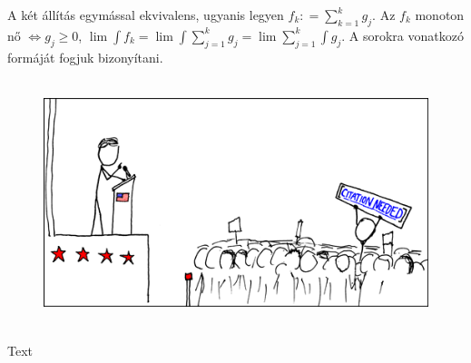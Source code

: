 \documentclass[12pt,a4paper]{scrartcl}
\newenvironment{ajanlofig}{\begin{figure}\begin{center}}{
\end{center}\end{figure}}
\begin{document}
A két állítás egymással ekvivalens, ugyanis legyen
\(f_{k}: = {\sum\limits_{k = 1}^{k}g_{j}}\). Az \(f_{k}\) monoton nő
\(\left. \Leftrightarrow g_{j} \geq 0 \right.\),
\(\lim{\int f_{k}} = \lim{\int{\sum\limits_{j = 1}^{k}g_{j}}} = \lim{\sum\limits_{j = 1}^{k}{\int g_{j}}}\).
A sorokra vonatkozó formáját fogjuk bizonyítani.

\begin{ajanlo}

\begin{ajanlofig}

\href{https://xkcd.com}{\includegraphics[width=5.20833in,height=2.82292in]{wikipedian_protester.png}}

\end{ajanlofig}

Text

\end{ajanlo}
\end{document}
